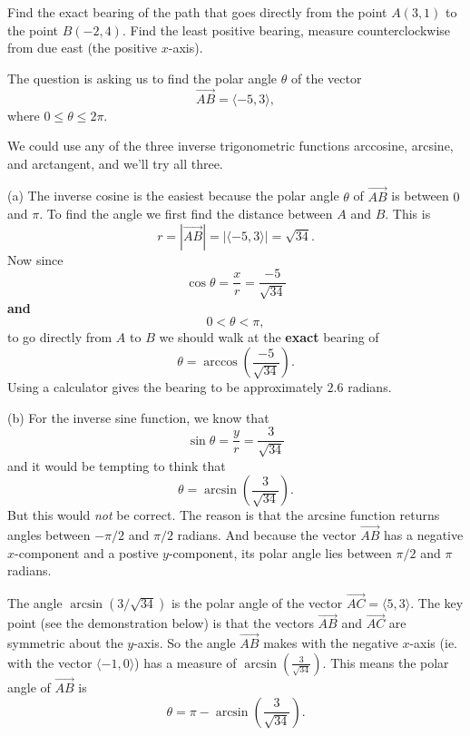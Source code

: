 \documentclass{ximera}
\begin{document}
\begin{example}  \label{Ed4t5t4dt44}
Find the exact bearing of the path that goes directly from the point $A(3,1)$ to the point $B(-2,4)$. Find the least positive bearing, measure counterclockwise from due east (the positive $x$-axis).

\begin{explanation}
The question is asking us to find the polar angle $\theta$ of the vector
\[
      \overrightarrow{AB} = \langle -5, 3  \rangle ,
\]
where $0\leq \theta \leq 2\pi$.

We could use any of the three inverse trigonometric functions arccosine, arcsine, and arctangent, and we'll try all three.

(a) The inverse cosine is the easiest because the polar angle $\theta$ of $\overrightarrow{AB}$ is between $0$ and $\pi$. To find the angle we first find the distance between $A$ and $B$. This is 
\[
   r =      | \overrightarrow{AB} | = | \langle -5, 3  \rangle | = \sqrt{34} .
\]
Now since
\[
   \cos\theta = \frac{x}{r} = \frac{-5}{\sqrt{34}}
\]
{\bf and}
\[
      0< \theta < \pi ,
\]
to go directly from $A$ to $B$ we should walk at the {\bf exact} bearing of
\[
     \theta = \arccos \left(  \frac{-5}{\sqrt{34}}  \right) .
\]
Using a calculator gives the bearing to be approximately $2.6$ radians.

(b) For the inverse sine function, we know that
\[
   \sin\theta = \frac{y}{r} = \frac{3}{\sqrt{34}}
\]
and it would be tempting to think that 
\[
  \theta = \arcsin \left(  \frac{3}{\sqrt{34}}  \right) .
\]
But this would \emph{not} be correct. The reason is that the arcsine function returns angles between $-\pi/2$ and $\pi/2$ radians. And because the vector $\overrightarrow{AB}$ has a negative $x$-component and a postive $y$-component, its polar angle lies between $\pi/2$ and $\pi$ radians.

The angle $\arcsin(3/\sqrt{34})$ is the polar angle of the vector $\overrightarrow{AC} = \langle 5, 3 \rangle$. The key point  (see the demonstration below) is that the vectors $\overrightarrow{AB}$ and $\overrightarrow{AC}$ are symmetric about the $y$-axis. So the angle $\overrightarrow{AB}$ makes with the negative $x$-axis (ie. with the vector $\langle -1,0\rangle$) has a measure of $ \arcsin \left(  \frac{3}{\sqrt{34}}  \right)$. This means the polar angle of $\overrightarrow{AB}$ is
\[
   \theta = \pi - \arcsin  \left(  \frac{3}{\sqrt{34}}  \right) .
\]



\begin{exploration} 
\begin{onlineOnly}
    \begin{center}
\end{center}
\end{onlineOnly}


\end{exploration}
\end{explanation}
\end{example}
\end{document}
